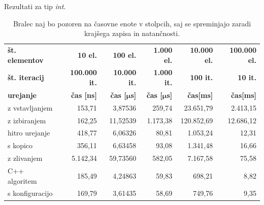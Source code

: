 \documentclass[a4paper,oneside,12pt]{article}
\newcommand{\bmu}{\ensuremath{\boldsymbol{\mu}}}
\newcommand{\usec}{\ensuremath{\bmu}s}
\begin{document}
\begin{table}[h!]
  \caption[Rezultati za tip \emph{int}]{Rezultati za tip \emph{int}.}
  \caption*{{\small Bralec naj bo pozoren na časovne enote
  v stolpcih, saj se spreminjajo zaradi krajšega zapisa in natančnosti.}}
  \label{tab:rez:int} \vspace{1ex}
  \begin{tabular}{l!{\vrule width 1pt}r|r|r|r|r}
    \bf št. elementov    & \bf 10 el.& \bf 100 el.& \bf 1.000 el. & \bf 10.000 el. & \bf 100.000 el. \\ 
    \bf št. iteracij     & \bf 100.000 it. & \bf 10.000 it. & \bf 1.000 it. & \bf 100 it. &  \bf 10 it.\\ \hline
    \bf urejanje         & \bf čas [ns] & \bf čas [\usec] & \bf čas [\usec] & \bf čas[ms] & \bf čas[ms] \\  
    z vstavljanjem       &   153,71 &  3,87536 &  259,74  &  23.651,79  &  2.413,15 \\ \hline
    z izbiranjem         &   162,25 & 11,52539 & 1.173,38 & 120.852,69  & 12.686,12 \\ \hline
    hitro urejanje       &   418,77 &  6,06326 &   80,81  &   1.053,24  &     12,31 \\ \hline
    s kopico             &   356,11 &  6,63458 &   93,08  &   1.341,48  &     16,66 \\ \hline
    z zlivanjem          & 5.142,34 & 59,73560 &  582,05  &   7.167,58  &     75,58 \\ \hline
    C++ algoritem        &   185,49 &  4,24863 &   59,83  &     698,21  &      8,82 \\ \hline
    s konfiguracijo      &   169,79 &  3,61435 &   58,69  &     749,76  &      9,35 \\ 
  \end{tabular}
\end{table}
\end{document}
